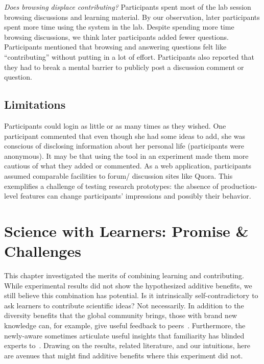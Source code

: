 \textit{Does browsing displace contributing?}
Participants spent most of the lab session browsing discussions and learning material. By our observation, later participants spent more time using the system in the lab. Despite spending more time browsing discussions, we think later participants added fewer questions. Participants mentioned that browsing and answering questions felt like “contributing” without putting in a lot of effort. Participants also reported that they had to break a mental barrier to publicly post a discussion comment or question. 

\subsection*{Limitations}
Participants could login as little or as many times as they wished. One participant commented that even though she had some ideas to add, she was conscious of disclosing information about her personal life (participants were anonymous). It may be that using the tool in an experiment made them more cautious of what they added or commented.
As a web application, participants assumed comparable facilities to forum/ discussion sites like Quora. This exemplifies a challenge of testing research prototypes: the absence of production-level features can change participants’ impressions and possibly their behavior.

\section{Science with Learners: Promise \& Challenges}
This chapter investigated the merits of combining learning and contributing. While experimental results did not show the hypothesized additive benefits, we still believe this combination has potential. Is it intrinsically self-contradictory to ask learners to contribute scientific ideas? Not necessarily. In addition to the diversity benefits that the global community brings, those with brand new knowledge can, for example, give useful feedback to peers~\cite{Kulkarni2013peer}. Furthermore, the newly-aware sometimes articulate useful insights that familiarity has blinded experts to~\cite{Hinds1999}. Drawing on the results, related literature, and our intuitions, here are avenues that might find additive benefits where this experiment did not.


